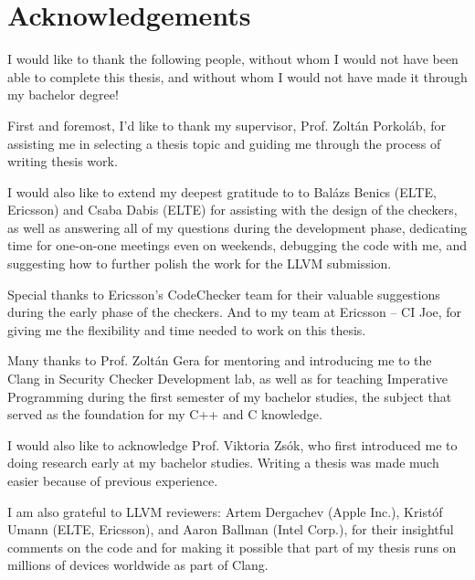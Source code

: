 \section*{Acknowledgements}
I would like to thank the following people, without whom I would not have been able to complete this thesis, and without whom I would not have made it through my bachelor degree! 

First and foremost, I'd like to thank my supervisor, Prof. Zoltán Porkoláb, for assisting me in selecting a thesis topic and guiding me through the process of writing thesis work. 

I would also like to extend my deepest gratitude to to Balázs Benics (ELTE, Ericsson) and Csaba Dabis (ELTE) for assisting with the design of the checkers, as well as answering all of my questions during the development phase, dedicating time for one-on-one meetings even on weekends, debugging the code with me, and suggesting how to further polish the work for the LLVM submission. 

Special thanks to Ericsson's CodeChecker team for their valuable suggestions during the early phase of the checkers. And to my team at Ericsson -- CI Joe, for giving me the flexibility and time needed to work on this thesis. 

Many thanks to Prof. Zoltán Gera for mentoring and introducing me to the Clang in Security Checker Development lab, as well as for teaching Imperative Programming during the first semester of my bachelor studies, the subject that served as the foundation for my C++ and C knowledge. 

I would also like to acknowledge Prof. Viktoria Zsók, who first introduced me to doing research early at my bachelor studies. Writing a thesis was made much easier because of previous experience. 

I am also grateful to LLVM reviewers: Artem Dergachev (Apple Inc.), Kristóf Umann (ELTE, Ericsson), and Aaron Ballman (Intel Corp.), for their insightful comments on the code and for making it possible that part of my thesis runs on millions of devices worldwide as part of Clang.
